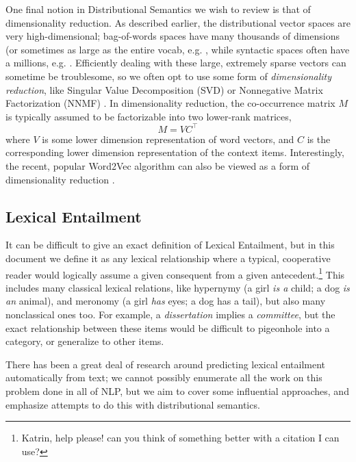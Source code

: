 \documentclass[12pt]{article}
\begin{document}
One final notion in Distributional Semantics we wish to review is that of
dimensionality reduction. As described earlier, the distributional vector
spaces are very high-dimensional; bag-of-words spaces have many thousands of
dimensions (or sometimes as large as the entire vocab, e.g.
, while syntactic spaces often have a millions,
e.g. . Efficiently dealing
with these large, extremely sparse vectors can sometime be troublesome, so
we often opt to use some form of {\em dimensionality reduction}, like
Singular Value Decomposition (SVD) \cite{landauer:1997:pr} or Nonnegative Matrix
Factorization (NNMF) \cite{lee:2000:nips}. In dimensionality
reduction, the co-occurrence matrix $M$ is typically assumed to be factorizable
into two lower-rank matrices,
\begin{equation*}
  M = VC^{\top}
\end{equation*}
where $V$ is some lower dimension representation of word vectors, and $C$
is the corresponding lower dimension representation of the context items.
Interestingly, the recent, popular Word2Vec algorithm \cite{mikolov:2013:iclr}
can also be viewed as a form of dimensionality reduction \cite{levy:2014:nips}.

\subsection{Lexical Entailment}

It can be difficult to give an exact definition of Lexical Entailment, but in
this document we define it as any lexical relationship where a typical,
cooperative reader would logically assume a given consequent from a given
antecedent.\footnote{Katrin, help please!  can you think of something better
with a citation I can use?} This includes many classical lexical relations,
like hypernymy (a girl {\em is a} child; a dog {\em is an} animal), and
meronomy (a girl {\em has} eyes; a dog {has a} tail), but also many
nonclassical ones too. For example, a {\em dissertation} implies a {\em
committee}, but the exact relationship between these items would be difficult
to pigeonhole into a category, or generalize to other items.

There has been a great deal of research around predicting lexical entailment
automatically from text; we cannot possibly enumerate all the work on this
problem done in all of NLP, but we aim to cover some influential approaches,
and emphasize attempts to do this with distributional semantics.
\end{document}
